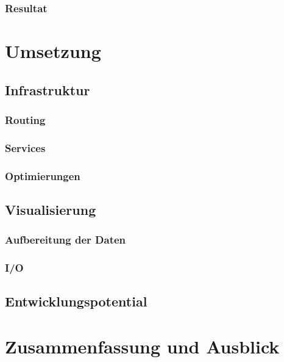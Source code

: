 \documentclass[12pt,a4paper,oneside, 
liststotoc, 					%
bibtotoc,						%
titlepage, 						%
headsepline, 					%
BCOR6mm,						%
openany,							%
]{scrreprt}
\begin{document}
  \subsection{Resultat}
\chapter{Umsetzung}
 \section{Infrastruktur}
  \subsection{Routing}
  \subsection{Services}
  \subsection{Optimierungen}
 \section{Visualisierung}
  \subsection{Aufbereitung der Daten}
  \subsection{I/O}
 \section{Entwicklungspotential}
\chapter{Zusammenfassung und Ausblick}



\printbibliography


\begin{appendix}
\clearpage
{}						%
\end{appendix}
\end{document}
